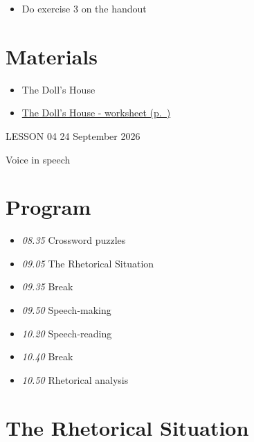 \documentclass[11pt,a4paper,oneside]{book}
\begin{document}
\begin{itemize}
\item Do exercise 3 on the handout
\end{itemize}

\section*{Materials}

\begin{itemize}
\item The Doll's House
\item \hyperref[worksheet-12]{The Doll's House - worksheet (p.~\pageref*{worksheet-12})}
\end{itemize}

\clearpage{}
{\color{blue}\small LESSON 04 \hfill 24 September 2026\par}
\vspace{4mm}
{\displayfont\color{navy}\fontsize{30}{34}\selectfont Voice in speech\par}\vspace{4mm}

\section*{Program}

\begin{itemize}
\item \emph{08.35} Crossword puzzles
\item \emph{09.05} The Rhetorical Situation
\item \emph{09.35} Break
\item \emph{09.50} Speech-making
\item \emph{10.20} Speech-reading
\item \emph{10.40} Break
\item \emph{10.50} Rhetorical analysis
\end{itemize}

\section*{The Rhetorical Situation}
\end{document}
